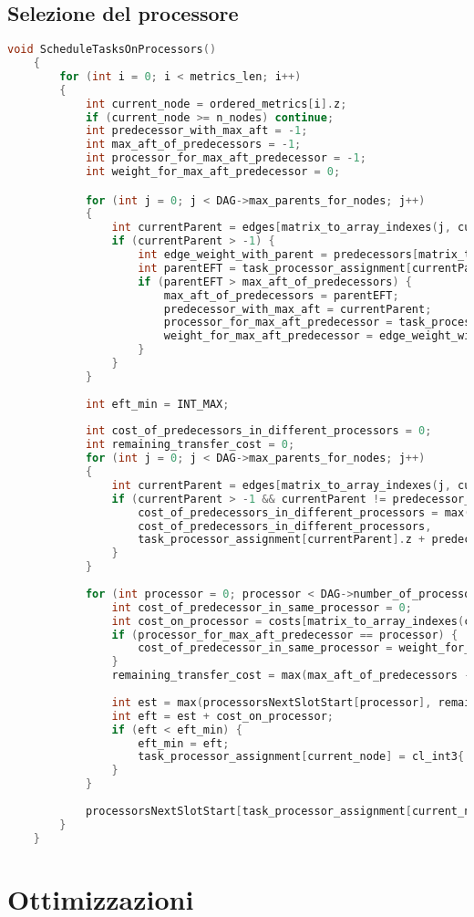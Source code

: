 \subsection{Selezione del processore}
\begin{lstlisting}[language=C++, caption={Compute metrics kernel II},captionpos=b]
	void ScheduleTasksOnProcessors()
	{
		for (int i = 0; i < metrics_len; i++)
		{
			int current_node = ordered_metrics[i].z; 
			if (current_node >= n_nodes) continue;
			int predecessor_with_max_aft = -1;
			int max_aft_of_predecessors = -1;
			int processor_for_max_aft_predecessor = -1;
			int weight_for_max_aft_predecessor = 0;

			for (int j = 0; j < DAG->max_parents_for_nodes; j++)
			{
				int currentParent = edges[matrix_to_array_indexes(j, current_node, DAG->len)];
				if (currentParent > -1) {
					int edge_weight_with_parent = predecessors[matrix_to_array_indexes(j, current_node, DAG->len)];
					int parentEFT = task_processor_assignment[currentParent].z + edge_weight_with_parent;
					if (parentEFT > max_aft_of_predecessors) {
						max_aft_of_predecessors = parentEFT;
						predecessor_with_max_aft = currentParent;
						processor_for_max_aft_predecessor = task_processor_assignment[currentParent].x;
						weight_for_max_aft_predecessor = edge_weight_with_parent;
					}
				}
			}
			
			int eft_min = INT_MAX;
			
			int cost_of_predecessors_in_different_processors = 0;
			int remaining_transfer_cost = 0;
			for (int j = 0; j < DAG->max_parents_for_nodes; j++)
			{
				int currentParent = edges[matrix_to_array_indexes(j, current_node, DAG->len)];
				if (currentParent > -1 && currentParent != predecessor_with_max_aft) {
					cost_of_predecessors_in_different_processors = max(
					cost_of_predecessors_in_different_processors,
					task_processor_assignment[currentParent].z + predecessors[matrix_to_array_indexes(j, current_node, DAG->len)]);
				}
			}
			
			for (int processor = 0; processor < DAG->number_of_processors; processor++) {
				int cost_of_predecessor_in_same_processor = 0;
				int cost_on_processor = costs[matrix_to_array_indexes(current_node, processor, DAG->number_of_processors)];
				if (processor_for_max_aft_predecessor == processor) {
					cost_of_predecessor_in_same_processor = weight_for_max_aft_predecessor;
				}
				remaining_transfer_cost = max(max_aft_of_predecessors - cost_of_predecessor_in_same_processor, cost_of_predecessors_in_different_processors);
				
				int est = max(processorsNextSlotStart[processor], remaining_transfer_cost);
				int eft = est + cost_on_processor;
				if (eft < eft_min) {
					eft_min = eft;
					task_processor_assignment[current_node] = cl_int3{ processor, est, eft };
				}
			}
			
			processorsNextSlotStart[task_processor_assignment[current_node].x] = task_processor_assignment[current_node].z;
		}
	}
\end{lstlisting}
\section{Ottimizzazioni}